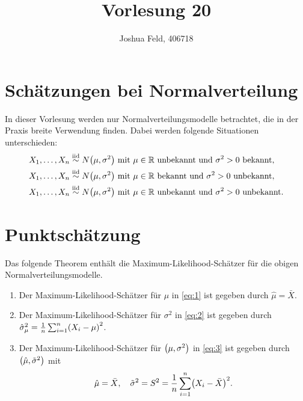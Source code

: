 \documentclass{lecture}
\institute{Institut für Statistik und Wirtschaftsmathematik}
\title{Vorlesung 20}
\author{Joshua Feld, 406718}
\begin{document}
    \maketitle

    
    \section*{Schätzungen bei Normalverteilung}
    
    In dieser Vorlesung werden nur Normalverteilungsmodelle betrachtet, die in der Praxis breite Verwendung finden.
    Dabei werden folgende Situationen unterschieden:
    \begin{align}
        X_1, \ldots, X_n &\stackrel{\text{iid}}{\sim} N\parentheses*{\mu, \sigma^2}\text{ mit }\mu \in \R\text{ unbekannt und }\sigma^2 > 0\text{ bekannt},\label{eq:1}\\
        X_1, \ldots, X_n &\stackrel{\text{iid}}{\sim} N\parentheses*{\mu, \sigma^2}\text{ mit }\mu \in \R\text{ bekannt und }\sigma^2 > 0\text{ unbekannt},\label{eq:2}\\
        X_1, \ldots, X_n &\stackrel{\text{iid}}{\sim} N\parentheses*{\mu, \sigma^2}\text{ mit }\mu \in \R\text{ unbekannt und }\sigma^2 > 0\text{ unbekannt}.\label{eq:3}
    \end{align}
    
    
    \section*{Punktschätzung}
    
    Das folgende Theorem enthält die Maximum-Likelihood-Schätzer für die obigen Normalverteilungsmodelle.
    
    \begin{theorem}
        \begin{enumerate}
            \item Der Maximum-Likelihood-Schätzer für \(\mu\) in \eqref{eq:1} ist gegeben durch \(\hat{\mu} = \bar{X}\).
            \item Der Maximum-Likelihood-Schätzer für \(\sigma^2\) in \eqref{eq:2} ist gegeben durch \(\hat{\sigma}_\mu^2 = \frac{1}{n}\sum_{i = 1}^n \parentheses*{X_i - \mu}^2\).
            \item Der Maximum-Likelihood-Schätzer für \(\parentheses*{\mu, \sigma^2}\) in \eqref{eq:3} ist gegeben durch \(\parentheses*{\hat{\mu}, \tilde{\sigma}^2}\) mit
            \[
                \hat{\mu} = \bar{X}, \quad \tilde{\sigma}^2 = S^2 = \frac{1}{n}\sum_{i = 1}^n \parentheses*{X_i - \bar{X}}^2.
            \]
        \end{enumerate}
    \end{theorem}
    
\end{document}
